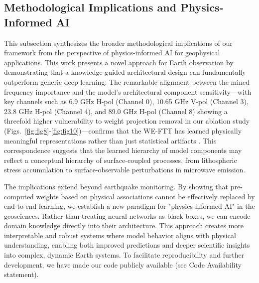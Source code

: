 \documentclass[preprint,review,12pt,authoryear]{elsarticle}
\begin{document}
\subsection{Methodological Implications and Physics-Informed AI}\label{sec:discuss_implications}
This subsection synthesizes the broader methodological implications of our framework from the perspective of physics-informed AI for geophysical applications. This work presents a novel approach for Earth observation by demonstrating that a knowledge-guided architectural design can fundamentally outperform generic deep learning. The remarkable alignment between the mined frequency importance and the model's architectural component sensitivity---with key channels such as 6.9 GHz H-pol (Channel 0), 10.65 GHz V-pol (Channel 3), 23.8 GHz H-pol (Channel 4), and 89.0 GHz H-pol (Channel 8) showing a threefold higher vulnerability to weight projection removal in our ablation study (Figs.~\ref{fig:fig8}-\ref{fig:fig10})---confirms that the WE-FTT has learned physically meaningful representations rather than just statistical artifacts \citep{maoAdditionalMicrowaveRadiation2020}. This correspondence suggests that the learned hierarchy of model components may reflect a conceptual hierarchy of surface-coupled processes, from lithospheric stress accumulation to surface-observable perturbations in microwave emission.

The implications extend beyond earthquake monitoring. By showing that pre-computed weights based on physical associations cannot be effectively replaced by end-to-end learning, we establish a new paradigm for "physics-informed AI" in the geosciences. Rather than treating neural networks as black boxes, we can encode domain knowledge directly into their architecture. This approach creates more interpretable and robust systems where model behavior aligns with physical understanding, enabling both improved predictions and deeper scientific insights into complex, dynamic Earth systems. To facilitate reproducibility and further development, we have made our code publicly available (see Code Availability statement).
\end{document}
